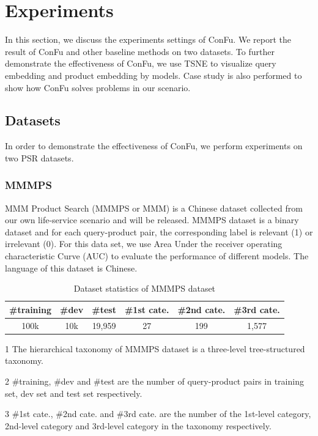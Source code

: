 \section{Experiments}

In this section, we discuss the experiments settings of ConFu. We report the result of ConFu and other baseline methods on two datasets. To further demonstrate the effectiveness of ConFu, we use TSNE \cite{van2008visualizing} to visualize query embedding and product embedding by models. Case study is also performed to show how ConFu solves problems in our scenario.

\subsection{Datasets}

In order to demonstrate the effectiveness of ConFu, we perform experiments on two PSR datasets. 

\subsubsection{MMMPS}
MMM Product Search (MMMPS or MMM) is a Chinese dataset collected from our own life-service scenario and will be released. MMMPS dataset is a binary dataset and for each query-product pair, the corresponding label is relevant (1) or irrelevant (0). For this data set, we use Area Under the receiver operating characteristic Curve (AUC) to evaluate the performance of different models. The language of this dataset is Chinese.

\begin{table}[th]
\setlength{\tabcolsep}{0.3pt}
\begin{threeparttable}[b]
  \caption{Dataset statistics of MMMPS dataset}
  \label{tb:dataset}
  \centering
  \begin{tabular}{cccccc}
    \toprule
    \#training  & \#dev  & \#test  & \#1st cate. & \#2nd cate. & \#3rd cate. \\
    \midrule
    100k & 10k & 19,959 & 27 & 199 & 1,577 \\
    \bottomrule
  \end{tabular}
  \begin{tablenotes}
    \item[1] The hierarchical taxonomy of MMMPS dataset is a three-level tree-structured taxonomy.
    \item[2] \#training, \#dev and \#test are the number of query-product pairs in training set, dev set and test set respectively.
    \item[3] \#1st cate., \#2nd cate. and \#3rd cate. are the number of the 1st-level category, 2nd-level category and 3rd-level category in the taxonomy respectively.
  \end{tablenotes}
  \end{threeparttable}
\end{table}

